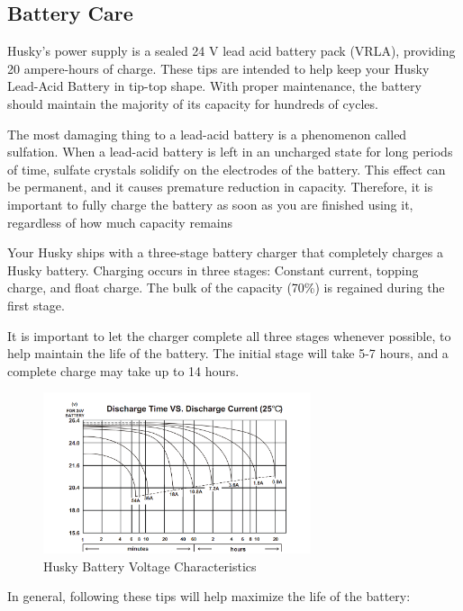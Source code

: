 \documentclass[]{clearpath-latex/clearpath-manual}
\begin{document}
\subsection{Battery Care}
Husky’s power supply is a sealed 24 V lead acid battery pack (VRLA), providing 20 ampere-hours of charge. These tips are 
intended to help keep your Husky Lead-Acid Battery in tip-top shape.  With proper maintenance, the battery should 
maintain the majority of its capacity for hundreds of cycles.

The most damaging thing to a lead-acid battery is a phenomenon called sulfation.  
When a lead-acid battery is left in an uncharged state for long periods of time, 
sulfate crystals solidify on the electrodes of the battery.  This effect can be permanent, 
and it causes premature reduction in capacity.  Therefore, it is important to fully charge 
the battery as soon as you are finished using it, regardless of how much capacity remains

Your Husky ships with a three-stage battery charger that completely charges a Husky battery.  
Charging occurs in three stages: Constant current, topping charge, and float charge.  
The bulk of the capacity (70\%) is regained during the first stage.

It is important to let the charger complete all three stages whenever possible, 
to help maintain the life of the battery.  The initial stage will take 5-7 hours,
and a complete charge may take up to 14 hours.

\begin{figure}[h]
	\centering
	\includegraphics[width=0.7\textwidth]{battery-chart.png}
	\caption{Husky Battery Voltage Characteristics}
	\label{battery-chart}
\end{figure}

In general, following these tips will help maximize the life of the battery:
\end{document}
